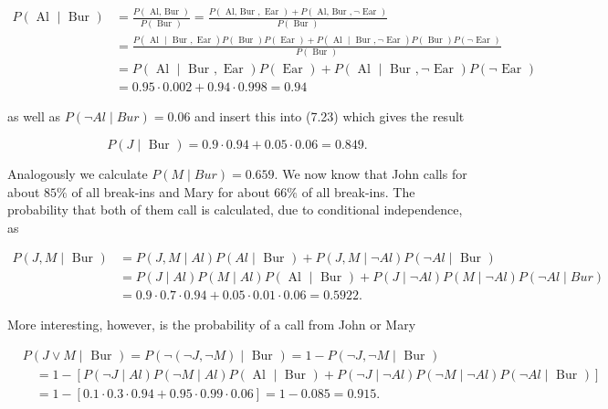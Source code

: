 \documentclass[10pt]{article}
\begin{document}
$$
\begin{aligned}
P(\text { Al } \mid \text { Bur }) & =\frac{P(\text { Al, Bur })}{P(\text { Bur })}=\frac{P(\text { Al, Bur }, \text { Ear })+P(\text { Al, Bur }, \neg \text { Ear })}{P(\text { Bur })} \\
& =\frac{P(\text { Al } \mid \text { Bur }, \text { Ear }) P(\text { Bur }) P(\text { Ear })+P(\text { Al } \mid \text { Bur }, \neg \text { Ear }) P(\text { Bur }) P(\neg \text { Ear })}{P(\text { Bur })} \\
& =P(\text { Al } \mid \text { Bur }, \text { Ear }) P(\text { Ear })+P(\text { Al } \mid \text { Bur }, \neg \text { Ear }) P(\neg \text { Ear }) \\
& =0.95 \cdot 0.002+0.94 \cdot 0.998=0.94
\end{aligned}
$$

as well as $P(\neg A l \mid B u r)=0.06$ and insert this into (7.23) which gives the result

$$
P(J \mid \text { Bur })=0.9 \cdot 0.94+0.05 \cdot 0.06=0.849 .
$$

Analogously we calculate $P(M \mid B u r)=0.659$. We now know that John calls for about $85 \%$ of all break-ins and Mary for about $66 \%$ of all break-ins. The probability that both of them call is calculated, due to conditional independence, as

$$
\begin{aligned}
P(J, M \mid \text { Bur }) & =P(J, M \mid A l) P(A l \mid \text { Bur })+P(J, M \mid \neg A l) P(\neg A l \mid \text { Bur }) \\
& =P(J \mid A l) P(M \mid A l) P(\text { Al } \mid \text { Bur })+P(J \mid \neg A l) P(M \mid \neg A l) P(\neg A l \mid B u r) \\
& =0.9 \cdot 0.7 \cdot 0.94+0.05 \cdot 0.01 \cdot 0.06=0.5922 .
\end{aligned}
$$

More interesting, however, is the probability of a call from John or Mary

$$
\begin{aligned}
& P(J \vee M \mid \text { Bur })=P(\neg(\neg J, \neg M) \mid \text { Bur })=1-P(\neg J, \neg M \mid \text { Bur }) \\
& \quad=1-[P(\neg J \mid A l) P(\neg M \mid A l) P(\text { Al } \mid \text { Bur })+P(\neg J \mid \neg A l) P(\neg M \mid \neg A l) P(\neg A l \mid \text { Bur })] \\
& \quad=1-[0.1 \cdot 0.3 \cdot 0.94+0.95 \cdot 0.99 \cdot 0.06]=1-0.085=0.915 .
\end{aligned}
$$
\end{document}
